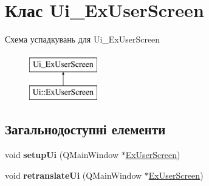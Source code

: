 \hypertarget{classUi__ExUserScreen}{\section{Клас Ui\-\_\-\-Ex\-User\-Screen}
\label{classUi__ExUserScreen}
}
Схема успадкувань для Ui\-\_\-\-Ex\-User\-Screen\begin{figure}[H]
\begin{center}
\leavevmode
\includegraphics[height=2.000000cm]{classUi__ExUserScreen}
\end{center}
\end{figure}
\subsection*{Загальнодоступні елементи}
\begin{DoxyCompactItemize}
\item 
\hypertarget{classUi__ExUserScreen_a166ae2661d465ac77a86487c3a394fcb}{void {\bfseries setup\-Ui} (Q\-Main\-Window $\ast$\hyperlink{classExUserScreen}{Ex\-User\-Screen})}\label{classUi__ExUserScreen_a166ae2661d465ac77a86487c3a394fcb}

\item 
\hypertarget{classUi__ExUserScreen_a4cc3648836b29adf36758dcff29d6761}{void {\bfseries retranslate\-Ui} (Q\-Main\-Window $\ast$\hyperlink{classExUserScreen}{Ex\-User\-Screen})}\label{classUi__ExUserScreen_a4cc3648836b29adf36758dcff29d6761}

\end{DoxyCompactItemize}
